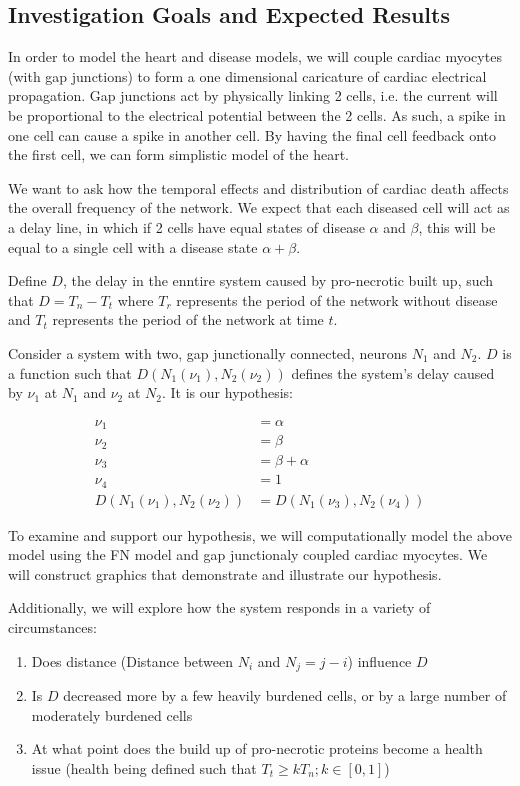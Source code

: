 \documentclass[11pt]{article}
\begin{document}
\subsection{Investigation Goals and Expected Results}

In order to model the heart and disease models, we will couple cardiac myocytes (with gap junctions) to form a one dimensional caricature of cardiac electrical propagation. Gap junctions act by physically linking 2 cells, i.e. the current will be proportional to the electrical potential between the 2 cells. As such, a spike in one cell can cause a spike in another cell. By having the final cell feedback onto the first cell, we can form simplistic model of the heart.

We want to ask how the temporal effects and distribution of cardiac death affects the overall frequency of the network. We expect that each diseased cell will act as a delay line, in which if 2 cells have equal states of disease $\alpha$ and $\beta$, this will be equal to a single cell with a disease state $\alpha+\beta$. 

Define $D$, the delay in the enntire system caused by pro-necrotic built up, such that $D=T_n - T_t$ where $T_r$ represents the period of the network without disease and $T_t$ represents the period of the network at time $t$. 

Consider a system with two, gap junctionally connected, neurons $N_1$ and $N_2$. $D$ is a function such that $D(N_1(\nu_1), N_2(\nu_2))$ defines the system's delay caused by $\nu_1$ at $N_1$ and $\nu_2$ at $N_2$. It is our hypothesis: 

\begin{align} 
\nu_1 &= \alpha \\ \nu_2 &= \beta \\ \nu_3 &= \beta + \alpha \\ \nu_4 &= 1 \\ D(N_1(\nu_1), N_2(\nu_2)) &= D(N_1(\nu_3), N_2(\nu_4)) 
\end{align} 

To examine and support our hypothesis, we will computationally model the above model using the FN model and gap junctionaly coupled cardiac myocytes. We will construct graphics that demonstrate and illustrate our hypothesis.

Additionally, we will explore how the system responds in a variety of circumstances:

\begin{enumerate}
	\item Does distance (Distance between $N_i$ and $N_j= j -i$) influence $D$
	\item Is $D$ decreased more by a few heavily burdened cells, or by a large number of moderately burdened cells
	\item At what point does the build up of pro-necrotic proteins become a health issue (health being defined such that $T_t \geq kT_n; k\in[0,1]$)
\end{enumerate}
\end{document}

